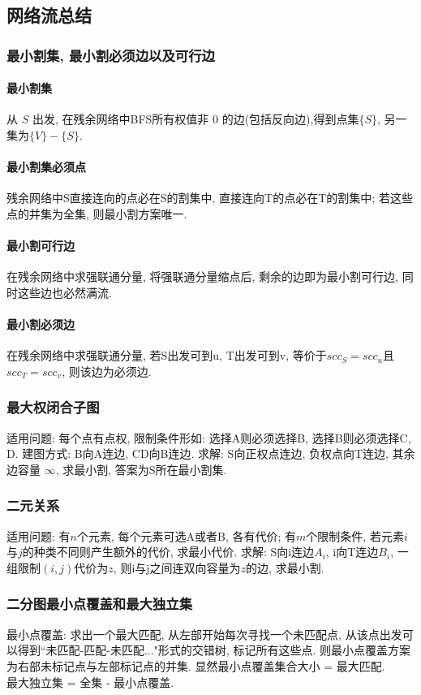 \subsection{网络流总结}

\subsubsection{最小割集, 最小割必须边以及可行边}
\noindent

\paragraph{最小割集} 从 $S$ 出发, 在残余网络中BFS所有权值非 $0$ 的边(包括反向边),得到点集$\{S\}$, 另一集为$\{V\} - \{S\}$. 
\paragraph{最小割集必须点} 残余网络中S直接连向的点必在S的割集中, 直接连向T的点必在T的割集中; 若这些点的并集为全集, 则最小割方案唯一.
\paragraph{最小割可行边} 在残余网络中求强联通分量, 将强联通分量缩点后, 剩余的边即为最小割可行边, 同时这些边也必然满流.
\paragraph{最小割必须边} 在残余网络中求强联通分量, 若S出发可到u, T出发可到v, 等价于$scc_S=scc_u$且$scc_T = scc_v$, 则该边为必须边.

\subsubsection{最大权闭合子图}
\noindent
适用问题: 每个点有点权, 限制条件形如: 选择A则必须选择B, 选择B则必须选择C, D. 建图方式: B向A连边, CD向B连边.
求解: S向正权点连边, 负权点向T连边, 其余边容量 $\infty$, 求最小割, 答案为S所在最小割集.

\subsubsection{二元关系}
\noindent
适用问题: 有$n$个元素, 每个元素可选A或者B, 各有代价; 有$m$个限制条件, 若元素$i$与$j$的种类不同则产生额外的代价, 求最小代价.
求解: S向i连边$A_i$, i向T连边$B_i$, 一组限制$(i,j)$代价为$z$, 则i与j之间连双向容量为$z$的边, 求最小割.

\subsubsection{二分图最小点覆盖和最大独立集}
\noindent
最小点覆盖: 求出一个最大匹配, 从左部开始每次寻找一个未匹配点, 从该点出发可以得到``未匹配-匹配-未匹配..."形式的交错树, 标记所有这些点. 则最小点覆盖方案为右部未标记点与左部标记点的并集. 显然最小点覆盖集合大小 = 最大匹配.\\
最大独立集 = 全集 - 最小点覆盖.


